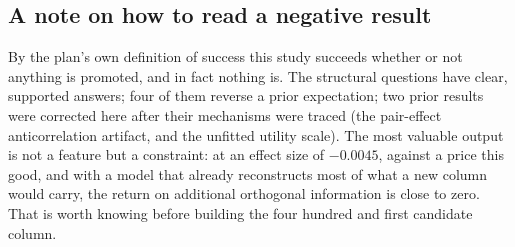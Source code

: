 \documentclass[11pt,a4paper]{article}
\begin{document}
\subsection*{A note on how to read a negative result}

By the plan's own definition of success this study succeeds whether or not
anything is promoted, and in fact nothing is. The structural questions have
clear, supported answers; four of them reverse a prior expectation; two prior
results were corrected here after their mechanisms were traced (the pair-effect
anticorrelation artifact, and the unfitted utility scale). The most valuable
output is not a feature but a constraint: at an effect size of $-0.0045$, against
a price this good, and with a model that already reconstructs most of what a new
column would carry, the return on additional orthogonal information is close to
zero. That is worth knowing before building the four hundred and first candidate
column.
\end{document}
